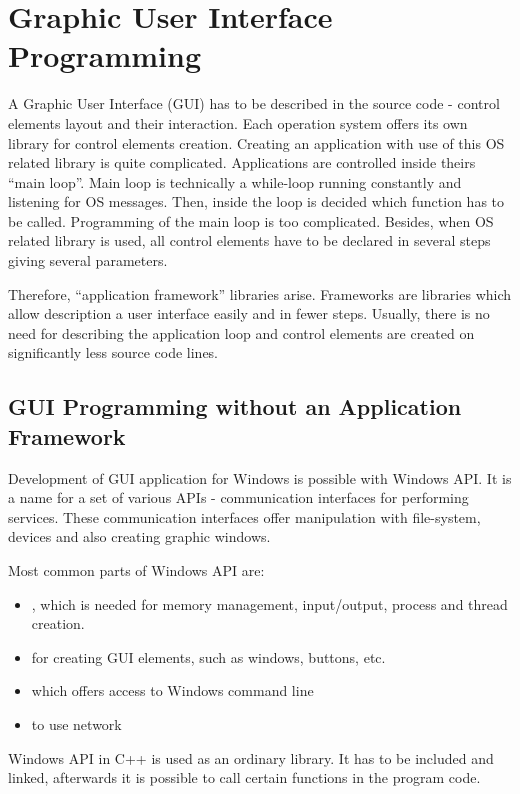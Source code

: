 \chapter{Graphic User Interface Programming}
\vspace{-10mm}

A Graphic User Interface (GUI) has to be described in the source code - control elements layout and their interaction. Each operation system offers its own library for control elements creation. Creating an application with use of this OS related library is quite complicated. Applications are controlled inside theirs ``main loop''. Main loop is technically a while-loop running constantly and listening for OS messages. Then, inside the loop is decided which function has to be called. Programming of the main loop is too complicated. Besides, when OS related library is used, all control elements have to be declared in several steps giving several parameters.

Therefore, ``application framework'' libraries arise. Frameworks are libraries which allow description a user interface easily and in fewer steps. Usually, there is no need for describing the application loop and control elements are created on significantly less source code lines.


\section{GUI Programming without an Application Framework}
\label{noqt}

Development of GUI application for Windows is possible with Windows API. It is a name for a set of various APIs - communication interfaces for performing services. These communication interfaces offer manipulation with file-system, devices and also creating graphic windows.

Most common parts of Windows API are:
\begin{itemize}
\item {}, which is needed for memory management, input/output, process and thread creation.
\item {} for creating GUI elements, such as windows, buttons, etc.
\item {} which offers access to Windows command line
\item {} to use network
\end{itemize}

Windows API in C++ is used as an ordinary library. It has to be included and linked, afterwards it is possible to call certain functions in the program code.


